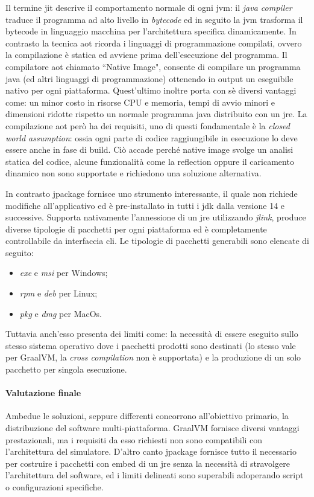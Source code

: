 Il termine \ac{jit} descrive il comportamento normale di ogni \ac{jvm}: il \textit{java compiler} traduce il programma ad alto livello in \textit{bytecode} ed in seguito la \ac{jvm} trasforma il bytecode in linguaggio macchina per l'architettura specifica dinamicamente. In contrasto la tecnica \ac{aot} ricorda i linguaggi di programmazione compilati, ovvero la compilazione è statica ed avviene prima dell'esecuzione del programma. Il compilatore \ac{aot} chiamato ``Native Image", consente di compilare un programma java (ed altri linguaggi di programmazione) ottenendo in output un eseguibile nativo per ogni piattaforma. Quest'ultimo inoltre porta con sè diversi vantaggi come: un minor costo in risorse CPU e memoria, tempi di avvio minori e dimensioni ridotte rispetto un normale programma java distribuito con un \ac{jre}. La compilazione \ac{aot} però ha dei requisiti, uno di questi fondamentale è la \textit{closed world assumption}: ossia ogni parte di codice raggiungibile in esecuzione lo deve essere anche in fase di build. Ciò accade perché native image svolge un analisi statica del codice, alcune funzionalità come la reflection oppure il caricamento dinamico non sono supportate e richiedono una soluzione alternativa.

In contrasto jpackage fornisce uno strumento interessante, il quale non richiede modifiche all'applicativo ed è pre-installato in tutti i \ac{jdk} dalla versione 14 e successive. Supporta nativamente l'annessione di un \ac{jre} utilizzando \textit{jlink}, produce diverse tipologie di pacchetti per ogni piattaforma ed è completamente controllabile da interfaccia \ac{cli}. Le tipologie di pacchetti generabili sono elencate di seguito:
\begin{itemize}
	\item \textit{exe} e \textit{msi} per Windows;
	\item \textit{rpm} e \textit{deb} per Linux;
	\item \textit{pkg} e \textit{dmg} per MacOs.
\end{itemize}
Tuttavia anch'esso presenta dei limiti come: la necessità di essere eseguito sullo stesso sistema operativo dove i pacchetti prodotti sono destinati (lo stesso vale per GraalVM, la \textit{cross compilation} non è supportata) e la produzione di un solo pacchetto per singola esecuzione.

\paragraph{Valutazione finale} Ambedue le soluzioni, seppure differenti concorrono all'obiettivo primario, la distribuzione del software multi-piattaforma. GraalVM fornisce diversi vantaggi prestazionali, ma i requisiti da esso richiesti non sono compatibili con l'architettura del simulatore. D'altro canto jpackage fornisce tutto il necessario per costruire i pacchetti con embed di un \ac{jre} senza la necessità di stravolgere l'architettura del software, ed i limiti delineati sono superabili adoperando script o configurazioni specifiche.


